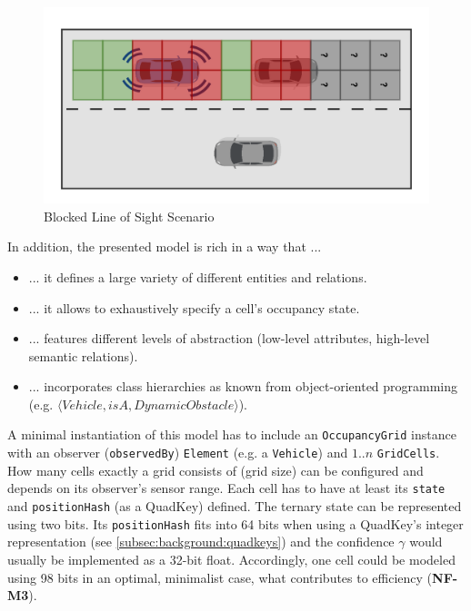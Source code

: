 \begin{figure}[h]
	\centering
	\includegraphics[width=0.7\linewidth]{98_images/unknown_cells_scene}
	\caption{Blocked Line of Sight Scenario}
	\label{fig:blocked_los_scenario}
\end{figure}


In addition, the presented model is rich in a way that ...

\begin{samepage}
	\begin{itemize}
		\item ... it defines a large variety of different entities and relations.
		\item ... it allows to exhaustively specify a cell's occupancy state.
		\item ... features different levels of abstraction (low-level attributes, high-level semantic relations).
		\item ... incorporates class hierarchies as known from object-oriented programming (e.g. $\langle Vehicle, isA, DynamicObstacle \rangle$).
	\end{itemize}
\end{samepage}

A minimal instantiation of this model has to include an \texttt{OccupancyGrid} instance with an observer (\texttt{observedBy}) \texttt{Element} (e.g. a \texttt{Vehicle}) and  $1..n$ \texttt{GridCells}. How many cells exactly a grid consists of (grid size) can be configured and depends on its observer's sensor range. Each cell has to have at least its \texttt{state} and \texttt{positionHash} (as a QuadKey) defined. The ternary state can be represented using two bits. Its \texttt{positionHash} fits into 64 bits when using a QuadKey's integer representation (see \cref{subsec:background:quadkeys}) and the confidence $\gamma$ would usually be implemented as a 32-bit float. Accordingly, one cell could be modeled using 98 bits in an optimal, minimalist case, what contributes to efficiency (\textbf{NF-M3}).

